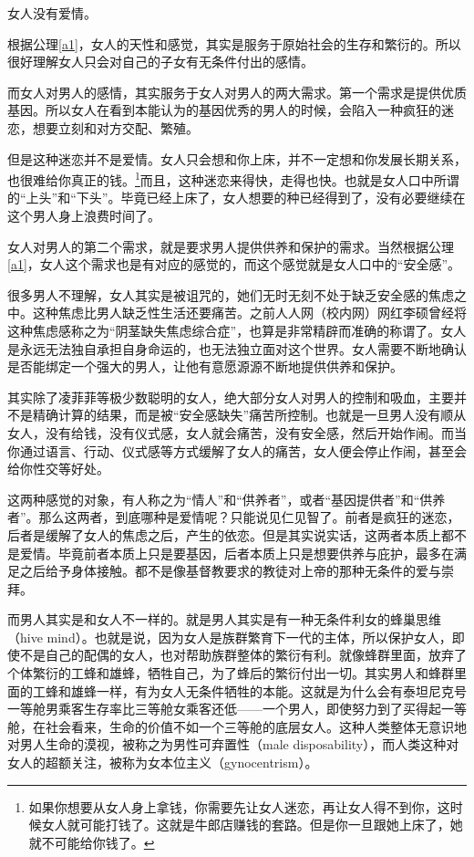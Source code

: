 \begin{corollary}\label{c2}
女人没有爱情。
\end{corollary}

根据公理\ref{a1}，女人的天性和感觉，其实是服务于原始社会的生存和繁衍的。所以很好理解女人只会对自己的子女有无条件付出的感情。

而女人对男人的感情，其实服务于女人对男人的两大需求。第一个需求是提供优质基因。所以女人在看到本能认为的基因优秀的男人的时候，会陷入一种疯狂的迷恋，想要立刻和对方交配、繁殖。

但是这种迷恋并不是爱情。女人只会想和你上床，并不一定想和你发展长期关系，也很难给你真正的钱。\footnote{如果你想要从女人身上拿钱，你需要先让女人迷恋，再让女人得不到你，这时候女人就可能打钱了。这就是牛郎店赚钱的套路。但是你一旦跟她上床了，她就不可能给你钱了。}而且，这种迷恋来得快，走得也快。也就是女人口中所谓的``上头''和``下头''。毕竟已经上床了，女人想要的种已经得到了，没有必要继续在这个男人身上浪费时间了。

女人对男人的第二个需求，就是要求男人提供供养和保护的需求。当然根据公理\ref{a1}，女人这个需求也是有对应的感觉的，而这个感觉就是女人口中的``安全感''。

很多男人不理解，女人其实是被诅咒的，她们无时无刻不处于缺乏安全感的焦虑之中。这种焦虑比男人缺乏性生活还要痛苦。之前人人网（校内网）网红李硕曾经将这种焦虑感称之为``阴茎缺失焦虑综合症''，也算是非常精辟而准确的称谓了。女人是永远无法独自承担自身命运的，也无法独立面对这个世界。女人需要不断地确认是否能绑定一个强大的男人，让他有意愿源源不断地提供供养和保护。

其实除了凌菲菲等极少数聪明的女人，绝大部分女人对男人的控制和吸血，主要并不是精确计算的结果，而是被``安全感缺失''痛苦所控制。也就是一旦男人没有顺从女人，没有给钱，没有仪式感，女人就会痛苦，没有安全感，然后开始作闹。而当你通过语言、行动、仪式感等方式缓解了女人的痛苦，女人便会停止作闹，甚至会给你性交等好处。

这两种感觉的对象，有人称之为``情人''和``供养者''，或者``基因提供者''和``供养者''。那么这两者，到底哪种是爱情呢？只能说见仁见智了。前者是疯狂的迷恋，后者是缓解了女人的焦虑之后，产生的依恋。但是其实说实话，这两者本质上都不是爱情。毕竟前者本质上只是要基因，后者本质上只是想要供养与庇护，最多在满足之后给予身体接触。都不是像基督教要求的教徒对上帝的那种无条件的爱与崇拜。

而男人其实是和女人不一样的。就是男人其实是有一种无条件利女的蜂巢思维（hive mind）。也就是说，因为女人是族群繁育下一代的主体，所以保护女人，即使不是自己的配偶的女人，也对帮助族群整体的繁衍有利。就像蜂群里面，放弃了个体繁衍的工蜂和雄蜂，牺牲自己，为了蜂后的繁衍付出一切。其实男人和蜂群里面的工蜂和雄蜂一样，有为女人无条件牺牲的本能。这就是为什么会有泰坦尼克号一等舱男乘客生存率比三等舱女乘客还低——一个男人，即使努力到了买得起一等舱，在社会看来，生命的价值不如一个三等舱的底层女人。这种人类整体无意识地对男人生命的漠视，被称之为男性可弃置性（male disposability），而人类这种对女人的超额关注，被称为女本位主义（gynocentrism）。

